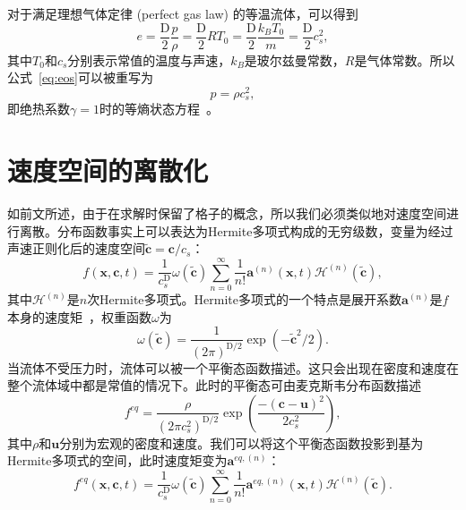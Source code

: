 对于满足理想气体定律 (perfect gas law) 的等温流体，可以得到
\begin{equation}
    e=\frac{\mathrm{D}}{2} \frac{p}{\rho}=\frac{\mathrm{D}}{2} R T_0=\frac{\mathrm{D}}{2} \frac{k_B T_0}{m}=\frac{\mathrm{D}}{2} c_s^2,
\end{equation}
其中$T_0$和$c_s$分别表示常值的温度与声速，$k_B$是玻尔兹曼常数，$R$是气体常数。所以公式~\ref{eq:eos}可以被重写为
\begin{equation}
    p=\rho c_s^2,
\end{equation}
即绝热系数$\gamma=1$时的等熵状态方程~\cite{kundu2015fluid}。


\section{速度空间的离散化}
如前文所述，由于在求解时保留了格子的概念，所以我们必须类似地对速度空间进行离散。分布函数事实上可以表达为Hermite多项式构成的无穷级数，变量为经过声速正则化后的速度空间$\tilde{\mathbf{c}}=\mathbf{c}/c_s$：
\begin{equation}
    f(\boldsymbol{x}, \mathbf{c}, t)=\frac{1}{c_s^{\mathrm{D}}} \omega(\tilde{\mathbf{c}}) \sum_{n=0}^{\infty} \frac{1}{n !} \boldsymbol{a}^{(n)}(\boldsymbol{x}, t) \mathscr{H}^{(n)}(\tilde{\mathbf{c}}),
    \label{eq:hermite_f}
\end{equation}
其中$\mathscr{H}^{(n)}$是$n$次Hermite多项式。Hermite多项式的一个特点是展开系数$\boldsymbol{a}^{(n)}$是$f$本身的速度矩~\cite{shan2006kinetic}，权重函数$\omega$为
\begin{equation}
    \omega(\tilde{\mathbf{c}})=\frac{1}{(2 \pi)^{\mathrm{D} / 2}} \exp \left(-\tilde{\mathbf{c}}^2 / 2\right).
\end{equation}
当流体不受压力时，流体可以被一个平衡态函数描述。这只会出现在密度和速度在整个流体域中都是常值的情况下。此时的平衡态可由麦克斯韦分布函数描述
\begin{equation}
    f^{eq}=\frac{\rho}{\left(2 \pi c_s^2\right)^{\mathrm{D} / 2}} \exp \left(\frac{-(\mathbf{c}-\boldsymbol{u})^2}{2 c_s^2}\right),
    \label{eq:maxwell_eq}
\end{equation}
其中$\rho$和$\boldsymbol{u}$分别为宏观的密度和速度。我们可以将这个平衡态函数投影到基为Hermite多项式的空间，此时速度矩变为$\boldsymbol{a}^{eq,(n)}$：
\begin{equation}
    f^{eq}(\boldsymbol{x}, \mathbf{c}, t)=\frac{1}{c_s^{\mathrm{D}}} \omega(\tilde{\mathbf{c}}) \sum_{n=0}^{\infty} \frac{1}{n !} \boldsymbol{a}^{eq,(n)}(\boldsymbol{x}, t) \mathscr{H}^{(n)}(\tilde{\mathbf{c}}).
    \label{eq:maxwell_eq_hermite}
\end{equation}
